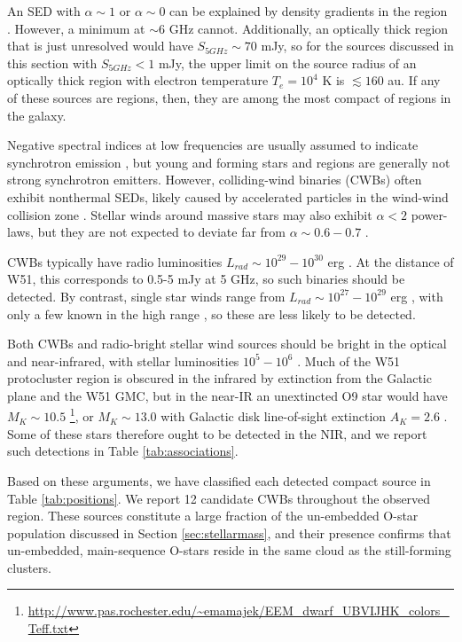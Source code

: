 An SED with $\alpha\sim1$ or $\alpha\sim0$ can be explained by density
gradients in the \hii region \citep{Keto2008a,Galvan-Madrid2009a}. However, a
minimum at $\sim6$ GHz cannot.  Additionally, an optically thick \hii region that
is just unresolved would have $S_{5 GHz} \sim 70$ mJy, so for the sources
discussed in this section with $S_{5 GHz} < 1$ mJy, the upper limit on the
source radius of an optically thick \hii region with electron temperature
$T_e=10^4$ K is $\lesssim160$ au.  If any of these sources are \hii regions,
then, they are among the most compact of \hchii regions in the galaxy.




Negative spectral indices at low frequencies are usually assumed to indicate
synchrotron emission \citep{Wilson2009a,Condon2007a}, but young and forming
stars and \hii regions are generally not strong synchrotron emitters.  However,
colliding-wind binaries (CWBs) often exhibit nonthermal SEDs, likely caused by
accelerated particles in the wind-wind collision zone \citep{De-Becker2013a}.
Stellar winds around massive stars may also exhibit $\alpha<2$ power-laws, but
they are not expected to deviate far from $\alpha\sim0.6-0.7$
\citep{Wright1975a,Panagia1975b,Reynolds1986a}.

CWBs typically have radio luminosities
$L_{rad}\sim10^{29}-10^{30}$ erg \pers \citep{De-Becker2013a}.   At the
distance of W51, this corresponds to 0.5-5 mJy at 5 GHz, so such binaries
should be detected.  By contrast, single star winds range from $L_{rad} \sim
10^{27}-10^{29}$ erg \pers, with only a few known in the high range
\citep{Bieging1989a}, so these are less likely to be detected.

Both CWBs and radio-bright stellar wind sources should be bright in the
optical and near-infrared, with stellar luminosities $10^5-10^6$ \lsun.
Much of the W51 protocluster region is obscured in the infrared by extinction
from the Galactic plane and the W51 GMC, but in the near-IR an unextincted O9
star would have
$M_K\sim10.5$
\citep{Pecaut2013a}\footnote{\url{http://www.pas.rochester.edu/~emamajek/EEM_dwarf_UBVIJHK_colors_Teff.txt}},
or $M_K\sim 13.0$ with Galactic disk line-of-sight extinction $A_K=2.6$
\citep{Goldader1994a}.  Some of these stars therefore ought to be detected in
the NIR, and we report such detections in Table \ref{tab:associations}.

Based on these arguments, we have classified each detected compact source in
Table \ref{tab:positions}.  We report 12 candidate CWBs throughout the observed
region.  These sources constitute a large fraction of the un-embedded O-star
population discussed in Section \ref{sec:stellarmass}, and their presence confirms
that un-embedded, main-sequence O-stars reside in the same cloud as the still-forming
clusters.

